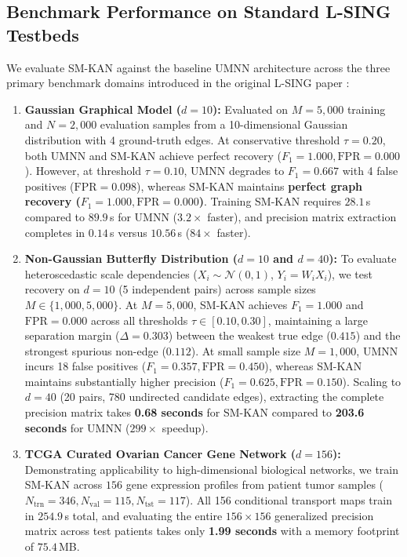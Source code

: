 \documentclass[11pt,a4paper]{article}
\theoremstyle{plain}
\theoremstyle{definition}
\theoremstyle{remark}
\begin{document}
\subsection{Benchmark Performance on Standard L-SING Testbeds}
\label{subsec:lsing_benchmarks}

We evaluate SM-KAN against the baseline UMNN architecture across the three primary benchmark domains introduced in the original L-SING paper \cite{liaw2025learning}:

\begin{enumerate}
    \item \textbf{Gaussian Graphical Model ($d=10$):} Evaluated on $M=5{,}000$ training and $N=2{,}000$ evaluation samples from a 10-dimensional Gaussian distribution with 4 ground-truth edges. At conservative threshold $\tau = 0.20$, both UMNN and SM-KAN achieve perfect recovery ($F_1 = 1.000, \text{FPR} = 0.000$). However, at threshold $\tau = 0.10$, UMNN degrades to $F_1 = 0.667$ with 4 false positives ($\text{FPR} = 0.098$), whereas SM-KAN maintains \textbf{perfect graph recovery ($F_1 = 1.000, \text{FPR} = 0.000$)}. Training SM-KAN requires $28.1$\,s compared to $89.9$\,s for UMNN ($3.2\times$ faster), and precision matrix extraction completes in $0.14$\,s versus $10.56$\,s ($84\times$ faster).

    \item \textbf{Non-Gaussian Butterfly Distribution ($d=10$ and $d=40$):} To evaluate heteroscedastic scale dependencies ($X_i \sim \mathcal{N}(0, 1)$, $Y_i = W_i X_i$), we test recovery on $d=10$ (5 independent pairs) across sample sizes $M \in \{1{,}000, 5{,}000\}$. At $M=5{,}000$, SM-KAN achieves $F_1 = 1.000$ and $\text{FPR} = 0.000$ across all thresholds $\tau \in [0.10, 0.30]$, maintaining a large separation margin ($\Delta = 0.303$) between the weakest true edge ($0.415$) and the strongest spurious non-edge ($0.112$). At small sample size $M=1{,}000$, UMNN incurs 18 false positives ($F_1 = 0.357, \text{FPR} = 0.450$), whereas SM-KAN maintains substantially higher precision ($F_1 = 0.625, \text{FPR} = 0.150$). Scaling to $d=40$ (20 pairs, 780 undirected candidate edges), extracting the complete precision matrix takes \textbf{0.68 seconds} for SM-KAN compared to \textbf{203.6 seconds} for UMNN ($299\times$ speedup).

    \item \textbf{TCGA Curated Ovarian Cancer Gene Network ($d=156$):} Demonstrating applicability to high-dimensional biological networks, we train SM-KAN across $156$ gene expression profiles from patient tumor samples ($N_{\text{trn}}=346, N_{\text{val}}=115, N_{\text{tst}}=117$). All 156 conditional transport maps train in $254.9$\,s total, and evaluating the entire $156 \times 156$ generalized precision matrix across test patients takes only \textbf{1.99 seconds} with a memory footprint of $75.4$\,MB.
\end{enumerate}
\end{document}

